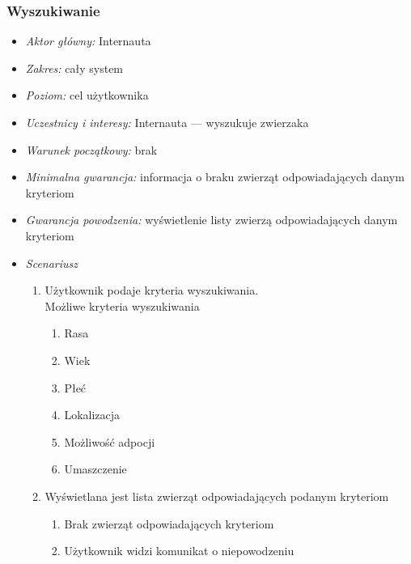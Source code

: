 \documentclass[10pt,a4paper]{article}
\begin{document}
\subsubsection{Wyszukiwanie}
\label{s_wyszukiwanie}
\begin{itemize}
	\item \emph{Aktor główny:} Internauta
	\item \emph{Zakres:} cały system
	\item \emph{Poziom:} cel użytkownika
	\item \emph{Uczestnicy i interesy:} 
		Internauta --- wyszukuje zwierzaka
	\item \emph{Warunek początkowy:} brak
	\item \emph{Minimalna gwarancja:} informacja o braku zwierząt odpowiadających danym kryteriom
	\item \emph{Gwarancja powodzenia:} wyświetlenie listy zwierzą odpowiadających danym kryteriom
	\item \emph{Scenariusz}
	\begin{enumerate}
		\item Użytkownik podaje kryteria wyszukiwania.\\
		Możliwe kryteria wyszukiwania
		\begin{enumerate}
			\item Rasa
			\item Wiek
			\item Płeć
			\item Lokalizacja
			\item Możliwość adpocji
			\item Umaszczenie
		\end{enumerate}	
		\item Wyświetlana jest lista zwierząt odpowiadających podanym kryteriom
		\begin{enumerate}
			\item Brak zwierząt odpowiadających kryteriom
			\item Użytkownik widzi komunikat o niepowodzeniu
		\end{enumerate}
	\end{enumerate}
\end{itemize}
\end{document}
